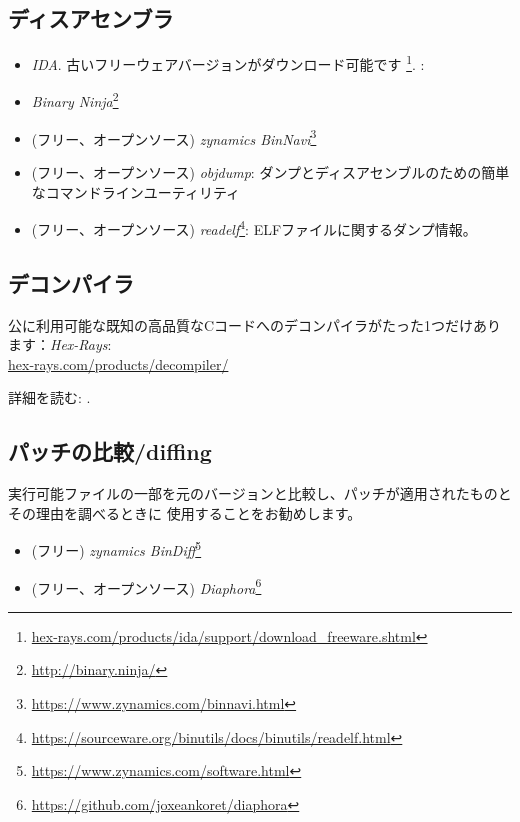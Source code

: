 \subsection{ディスアセンブラ}


\begin{itemize}
\item \emph{IDA}. 古いフリーウェアバージョンがダウンロード可能です
\footnote{\href{http://go.yurichev.com/17031}{hex-rays.com/products/ida/support/download\_freeware.shtml}}.
\ShortHotKeyCheatsheet: 

\item \emph{Binary Ninja}\footnote{\url{http://binary.ninja/}}

\item (フリー、オープンソース) \emph{zynamics BinNavi}\footnote{\url{https://www.zynamics.com/binnavi.html}}

\item (フリー、オープンソース) \emph{objdump}: ダンプとディスアセンブルのための簡単なコマンドラインユーティリティ

\item (フリー、オープンソース) \emph{readelf}\footnote{\url{https://sourceware.org/binutils/docs/binutils/readelf.html}}:
ELFファイルに関するダンプ情報。
\end{itemize}

\subsection{デコンパイラ}

公に利用可能な既知の高品質なCコードへのデコンパイラがたった1つだけあります：\emph{Hex-Rays}:\\
\href{http://go.yurichev.com/17033}{hex-rays.com/products/decompiler/}

詳細を読む: .

\subsection{パッチの比較/diffing}

実行可能ファイルの一部を元のバージョンと比較し、パッチが適用されたものとその理由を調べるときに
使用することをお勧めします。

\begin{itemize}
\item (フリー) \emph{zynamics BinDiff}\footnote{\url{https://www.zynamics.com/software.html}}

\item (フリー、オープンソース) \emph{Diaphora}\footnote{\url{https://github.com/joxeankoret/diaphora}}
\end{itemize}

